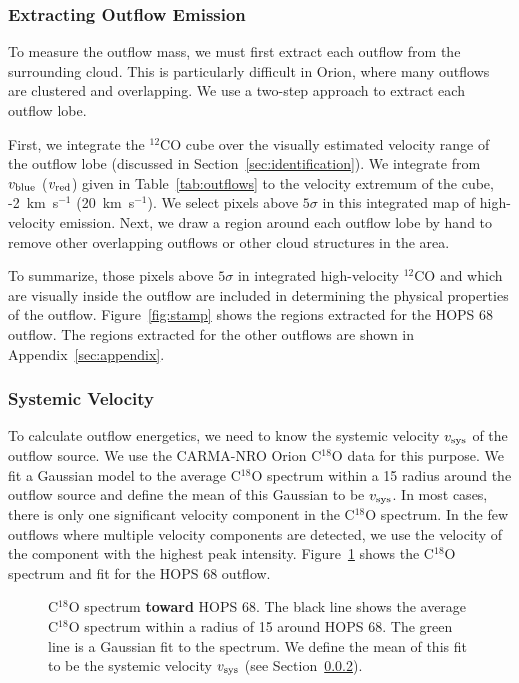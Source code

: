 \documentclass[twocolumn]{aastex63}
\newcommand{\example}{HOPS 68}
\newcommand{\kms}{km~s$^{-1}$}
\begin{document}
\subsubsection{Extracting Outflow Emission}\label{sec:extraction}
To measure the outflow mass, we must first extract each outflow from the surrounding cloud. This is particularly difficult in Orion, where many outflows are clustered and overlapping. We use a two-step approach to extract each outflow lobe.

First, we integrate the $^{12}$CO cube over the visually estimated velocity range of the outflow lobe (discussed in Section~\ref{sec:identification}). We integrate from $v_{\rm blue}$ ($v_{\rm red}$) given in Table~\ref{tab:outflows} to the velocity extremum of the cube, -2~\kms{} (20~\kms{}). We select pixels above $5\sigma$ in this integrated map of high-velocity emission. Next, we draw a region around each outflow lobe by hand to remove other overlapping outflows or other cloud structures in the area. %

To summarize, those pixels above $5\sigma$ in integrated high-velocity $^{12}$CO and which are visually inside the outflow are included in determining the physical properties of the outflow. Figure~\ref{fig:stamp} shows the regions extracted for the \example{} outflow. The regions extracted for the other outflows are shown in Appendix~\ref{sec:appendix}. 

\subsubsection{Systemic Velocity}\label{sec:vsys}
To calculate outflow energetics, we need to know the systemic velocity $v_{\rm sys}$ of the outflow source. We use the CARMA-NRO Orion C$^{18}$O data \citep{Kong18} for this purpose. We fit a Gaussian model to the average C$^{18}$O spectrum within a 15\arcsec{} radius around the outflow source and define the mean of this Gaussian to be $v_{\rm sys}$. In most cases, there is only one significant velocity component in the C$^{18}$O spectrum. In the few outflows where multiple velocity components are detected, we use the velocity of the component with the highest peak intensity. Figure~\ref{fig:c18o_fit} shows the C$^{18}$O spectrum and fit for the \example{} outflow.

\begin{figure}
\caption{C$^{18}$O spectrum \textbf{toward} \example{}. The black line shows the average C$^{18}$O spectrum within a radius of 15\arcsec{} around \example{}. The green line is a Gaussian fit to the spectrum. We define the mean of this fit to be the systemic velocity $v_{\rm sys}$ (see Section~\ref{sec:vsys}). \label{fig:c18o_fit}}
\end{figure}
\end{document}
